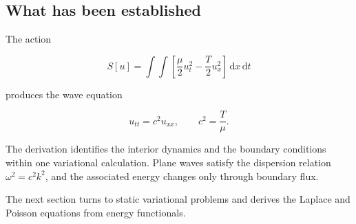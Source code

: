 \subsection{What has been established}

The action

\[
S[u]
=
\int\!\int
\left[
\frac{\mu}{2}u_{t}^{2}
-
\frac{T}{2}u_{x}^{2}
\right]
\,\mathrm{d}x\,\mathrm{d}t
\]

produces the wave equation

\[
u_{tt}=c^{2}u_{xx},
\qquad
c^{2}=\frac{T}{\mu}.
\]

The derivation identifies the interior dynamics and the boundary conditions within one variational calculation. Plane waves satisfy the dispersion relation \(\omega^{2}=c^{2}k^{2}\), and the associated energy changes only through boundary flux.

The next section turns to static variational problems and derives the Laplace and Poisson equations from energy functionals.
